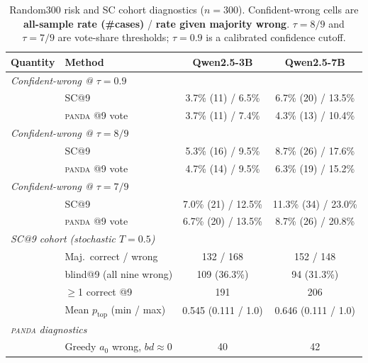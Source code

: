 \documentclass{article} %
\DeclareRobustCommand{\method}{%
  \texorpdfstring{%
    \ifmmode\text{\normalfont\textsc{panda}}\else\textsc{panda}\xspace\fi
  }{PANDA}%
}
\begin{document}
\begin{table}[htbp]
  \centering
  \footnotesize
  \setlength{\tabcolsep}{3.5pt}
  \renewcommand{\arraystretch}{1.05}
  \caption{Random300 risk and SC cohort diagnostics ($n{=}300$).
  Confident-wrong cells are \textbf{all-sample rate (\#cases)} / \textbf{rate given majority wrong}.
  $\tau{=}8/9$ and $\tau{=}7/9$ are vote-share thresholds; $\tau{=}0.9$ is a calibrated confidence cutoff.}
  \label{tab:random300-risk}
  \begin{tabular}{llcc}
    \toprule
    \rowcolor{headerpink}
    Quantity & Method & Qwen2.5-3B & Qwen2.5-7B \\
    \midrule
    \multicolumn{4}{l}{\textit{Confident-wrong @ $\tau{=}0.9$}} \\
    & SC@9 & 3.7\% (11) / 6.5\% & 6.7\% (20) / 13.5\% \\
    \rowcolor{rowgray}
    & \method{}@9 vote & 3.7\% (11) / 7.4\% & 4.3\% (13) / 10.4\% \\
    \multicolumn{4}{l}{\textit{Confident-wrong @ $\tau{=}8/9$}} \\
    & SC@9 & 5.3\% (16) / 9.5\% & 8.7\% (26) / 17.6\% \\
    \rowcolor{rowgray}
    & \method{}@9 vote & 4.7\% (14) / 9.5\% & 6.3\% (19) / 15.2\% \\
    \multicolumn{4}{l}{\textit{Confident-wrong @ $\tau{=}7/9$}} \\
    & SC@9 & 7.0\% (21) / 12.5\% & 11.3\% (34) / 23.0\% \\
    \rowcolor{rowgray}
    & \method{}@9 vote & 6.7\% (20) / 13.5\% & 8.7\% (26) / 20.8\% \\
    \midrule
    \multicolumn{4}{l}{\textit{SC@9 cohort (stochastic $T{=}0.5$)}} \\
    & Maj.\ correct / wrong & 132 / 168 & 152 / 148 \\
    \rowcolor{rowgray}
    & blind@9 (all nine wrong) & 109 (36.3\%) & 94 (31.3\%) \\
    & $\geq$1 correct @9 & 191 & 206 \\
    \rowcolor{rowgray}
    & Mean $p_{\mathrm{top}}$ (min / max) & 0.545 (0.111 / 1.0) & 0.646 (0.111 / 1.0) \\
    \midrule
    \multicolumn{4}{l}{\textit{\method{} diagnostics}} \\
    & Greedy $a_0$ wrong, $bd{\approx}0$ & 40 & 42 \\
    \bottomrule
  \end{tabular}
\end{table}
\end{document}
